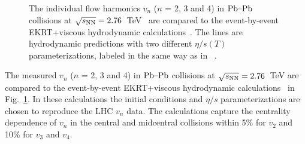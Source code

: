 \begin{figure}[h]
\begin{center}
        \caption{The individual flow harmonics $v_n$ ($n$ = 2, 3 and 4) in $\textnormal{Pb--Pb}$ collisions at $\sqrt{s_{\textnormal{NN}}}=2.76$~TeV~\cite{Adam:2016izf} are compared to the event-by-event EKRT+viscous hydrodynamic calculations~\cite{Niemi:2015qia}. The lines are hydrodynamic predictions with two different $\eta/s(T)$ parameterizations, labeled in the same way as in ~\cite{Niemi:2015qia}.}
        \label{fig:Figure_A1}
              \end{center}
\end{figure}

The measured $v_n$ ($n$ = 2, 3 and 4) in $\textnormal{Pb--Pb}$ collisions at $\sqrt{s_{\textnormal{NN}}}=2.76$~TeV are compared to the event-by-event EKRT+viscous hydrodynamic calculations~\cite{Niemi:2015qia} in Fig.~\ref{fig:Figure_A1}. In these calculations the initial conditions and $\eta/s$ parameterizations are chosen to reproduce the LHC $v_n$ data.
The calculations capture the centrality dependence of $v_n$ in the central and midcentral collisions within 5\% for $v_2$ and 10\% for $v_3$ and $v_4$.

